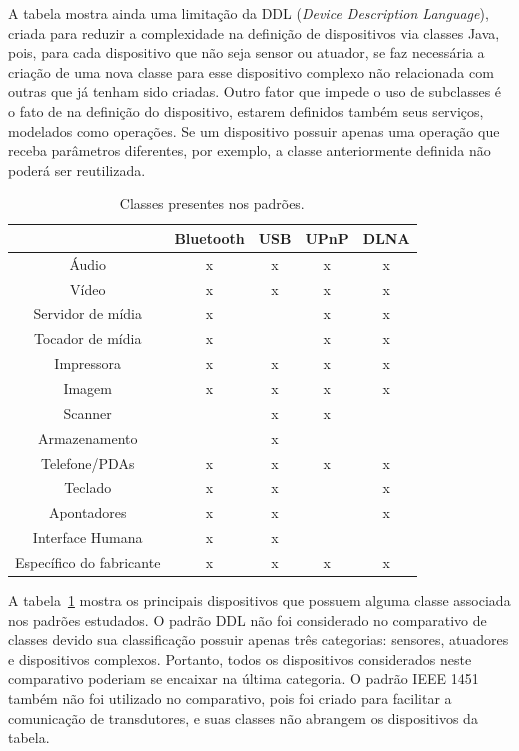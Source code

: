 A tabela mostra ainda uma limitação da DDL (\emph{Device Description Language}), criada para reduzir a complexidade na definição de dispositivos via classes Java, pois, para cada dispositivo que não seja sensor ou atuador, se faz necessária a criação de uma nova classe para esse dispositivo complexo não relacionada com outras que já tenham sido criadas. Outro fator que impede o uso de subclasses é o fato de na definição do dispositivo, estarem definidos também seus serviços, modelados como operações. Se um dispositivo possuir apenas uma operação que receba parâmetros diferentes, por exemplo, a classe anteriormente definida não poderá ser reutilizada. 

\begin{table}
	\caption{Classes presentes nos padrões.}
	\begin{center}
		\begin{tabular}{|ccccc|}
		\hline
									& \textbf{Bluetooth} 	& \textbf{USB}	& \textbf{UPnP} & \textbf{DLNA}	\\
		\hline
		Áudio						& x						& x				& x 			& x				\\
		\hline
		Vídeo						& x						& x				& x				& x				\\
		\hline
		Servidor de mídia			& x						&				& x 			& x				\\
		\hline
		Tocador de mídia			& x						&				& x				& x				\\
		\hline
		Impressora 					& x						& x				& x				& x				\\
		\hline
		Imagem	 					& x						& x				& x				& x				\\
		\hline
		Scanner						& 						& x				& x				& 				\\
		\hline
		Armazenamento				&						& x				& 				& 				\\	
		\hline
		Telefone/PDAs				& x						& x				& x				& x				\\
		\hline
		Teclado						& x						& x				& 				& x				\\
		\hline
		Apontadores					& x						& x				& 				& x 			\\
		\hline
		Interface Humana		 	& x						& x				&  				&  				\\
		\hline
		Específico do fabricante 	& x 					& x				& x				& x				\\
		\hline								
		\end{tabular}
	\end{center}
	\label{tab:comparativoClasses}
\end{table}

A tabela~\ref{tab:comparativoClasses} mostra os principais dispositivos que possuem alguma classe associada nos padrões estudados. O padrão DDL não foi considerado no comparativo de classes devido sua classificação possuir apenas três categorias: sensores, atuadores e dispositivos complexos. Portanto, todos os dispositivos considerados neste comparativo poderiam se encaixar na última categoria. O padrão IEEE 1451 também não foi utilizado no comparativo, pois foi criado para facilitar a comunicação de transdutores, e suas classes não abrangem os dispositivos da tabela.


